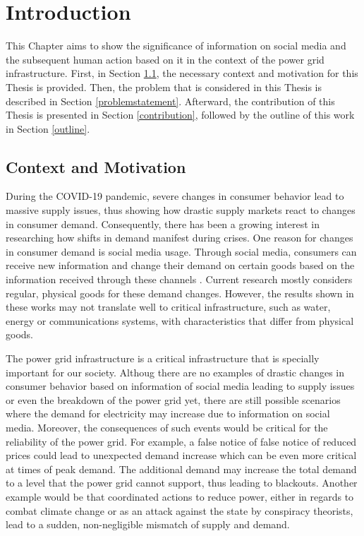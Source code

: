 \chapter{Introduction}

This Chapter aims to show the significance of information on social media and 
the subsequent human action based on it
in the context of the power grid infrastructure.
First, in Section \ref{contextmotivation}, the necessary context and 
motivation for this Thesis is provided.
Then, the problem that is considered in this Thesis is described 
in Section \ref{problemstatement}. Afterward, the contribution of this
Thesis is presented in Section \ref{contribution}, 
followed by the outline of this work in Section \ref{outline}.

\section{Context and Motivation}
\label{contextmotivation}

During the COVID-19 pandemic, severe changes in consumer behavior
lead to massive supply issues, thus showing how drastic supply markets 
react to changes in consumer demand.
Consequently, there has been a growing interest in researching 
how shifts in demand manifest during crises. 
One reason for changes in consumer demand is 
social media usage. Through social media, consumers can receive new information
and change their demand on certain goods based on the information received 
through these channels \cite{naeem2021social}.
Current research mostly considers regular, physical 
goods for these demand changes.
However, the results shown in these 
works may not translate well to critical infrastructure,
such as water, energy or communications systems,
with characteristics that differ from physical goods.

The power grid infrastructure is a critical infrastructure 
that is specially important for our society.
Althoug there are no examples of drastic changes in consumer behavior
based on information of social media leading to supply issues or
even the breakdown of the power grid yet, there are still
possible scenarios where the demand for
electricity may increase due to information on social media.
Moreover, the consequences of such events would be critical for the
reliability of the power grid.
For example, a false notice of false notice of reduced prices 
could lead to unexpected demand increase which 
can be even more critical at times of peak demand. 
The additional demand
may increase the total demand to a level that the power grid
cannot support, thus leading to blackouts.
Another example would be that coordinated actions to reduce
power, either in regards to combat climate change \cite{earthday}
or as an attack against the state by conspiracy theorists,
lead to a sudden, non-negligible mismatch of supply and demand.



